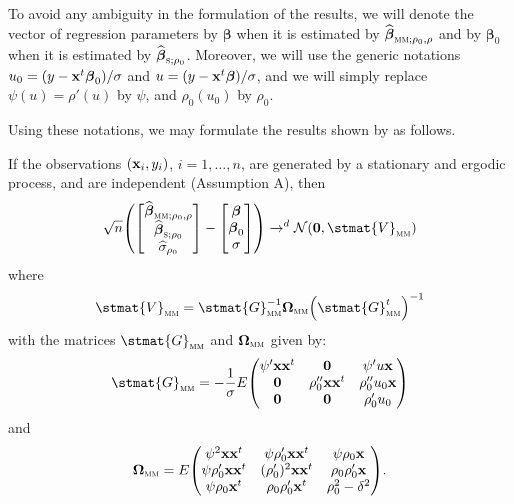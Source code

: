 To avoid any ambiguity in the formulation of the results, we will denote the
vector of regression parameters by $\boldsymbol\beta$ when it is estimated by
$\sthat{\boldsymbol\beta}_{\stsc{MM};\rho_0,\rho}$ and by $\boldsymbol\beta_0$
when it is estimated by $\sthat{\boldsymbol\beta}_{\stsc{S};\rho_0}$. Moreover,
we will use the generic notations $u_0 =
(y-\mathbf x^t\boldsymbol\beta_0)/\sigma$ and $u =
(y-\mathbf x^t\boldsymbol\beta)/\sigma$, and we will simply replace $\psi(u) =
\rho'(u)$ by $\psi$, and $\rho_0(u_0)$ by $\rho_0$.

Using these notations, we may formulate the results shown by \citet{Croux:2003}
as follows.

\begin{stproposition}
If the observations $(\mathbf x_i, y_i)$, $i = 1, \dots, n$, are generated 
by a stationary and ergodic process, and are independent (Assumption A), then
\[
    \sqrt{n} \left(
    \begin{bmatrix}
        \sthat{\boldsymbol\beta}_{\stsc{MM};\rho_0,\rho}\\
        \sthat{\boldsymbol\beta}_{\stsc{S};\rho_0}      \\
        \sthat{\sigma}_{\rho_0}
    \end{bmatrix}
    - 
    \begin{bmatrix}
        \boldsymbol\beta\\
        \boldsymbol\beta_0\\
        \sigma
    \end{bmatrix}
    \right) \rightarrow^d \mathcal{N}(\stvec{0},\stmat{V}_{\stsc{MM}})
\]
where
%
\begin{equation}\label{eq:V_MM}
    \stmat{V}_\stsc{MM} = \stmat{G}_\stsc{MM}^{-1}
    \boldsymbol\Omega_\stsc{MM} \left(\stmat{G}_\stsc{MM}^t\right)^{-1}
%
\end{equation}
%
with the matrices $\stmat{G}_\stsc{MM}$ and $\boldsymbol\Omega_\stsc{MM}$ given 
by:
%
\begin{equation}\label{eq:G_MM}
    \stmat{G}_\stsc{MM} = - \frac{1}{\sigma} 
    E\begin{pmatrix}
        \psi'\stvec{x}\stvec{x}^t & \stvec{0}                    & \psi'u\stvec{x}\\
        \stvec{0}                 & \rho_0''\stvec{x}\stvec{x}^t & \rho_0''u_0\stvec{x}\\
        \stvec{0}                 & \stvec{0}                    & \rho_0'u_0
    \end{pmatrix}
\end{equation}
%
and
%
\begin{equation}\label{eq:Omega_MM}
    \boldsymbol\Omega_\stsc{MM} = 
    E\begin{pmatrix}
        \psi^2\stvec{x}\stvec{x}^t      & \psi\rho_0'\stvec{x}\stvec{x}^t & \psi\rho_0\stvec{x} \\
        \psi\rho_0'\stvec{x}\stvec{x}^t & (\rho_0')^2\stvec{x}\stvec{x}^t & \rho_0\rho_0'\stvec{x}\\
        \psi\rho_0\stvec{x}^t           & \rho_0\rho_0'\stvec{x}^t        & \rho_0^2-\delta^2
    \end{pmatrix}.
\end{equation}
\end{stproposition}

